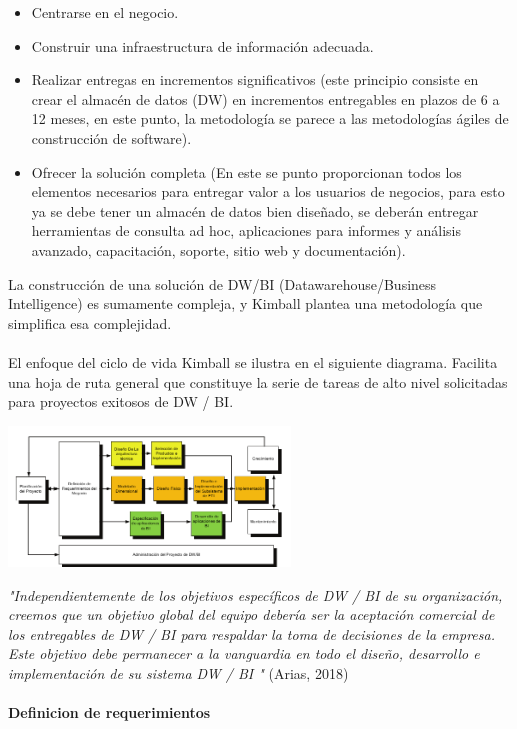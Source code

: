 \documentclass[twoside,twocolumn]{article}
\begin{document}
\begin{enumerate}
\begin{itemize}
\item Centrarse en el negocio.
\item Construir una infraestructura de información adecuada.
\item Realizar entregas en incrementos significativos (este principio consiste en crear el almacén de datos (DW) en incrementos entregables en plazos de 6 a 12 meses, en este punto, la metodología se parece a las metodologías ágiles de construcción de software).
\item Ofrecer la solución completa (En este se punto proporcionan todos los elementos necesarios para entregar valor a los usuarios de negocios, para esto ya se debe tener un almacén de datos bien diseñado, se deberán entregar herramientas de consulta ad hoc, aplicaciones para informes y análisis avanzado, capacitación, soporte, sitio web y documentación).

\end{itemize}
La construcción de una solución de DW/BI (Datawarehouse/Business Intelligence) es sumamente compleja, y Kimball plantea una metodología que simplifica esa complejidad. \\ \\
El enfoque del ciclo de vida Kimball se ilustra en el siguiente diagrama. Facilita una hoja de ruta general que constituye la serie de tareas de alto nivel solicitadas para proyectos exitosos de DW / BI.


\includegraphics[width=7.5cm]{Imagenes/Kimboll2}

\textit{"Independientemente de los objetivos específicos de DW / BI de su organización, creemos que un objetivo global del equipo debería ser la aceptación comercial de los entregables de DW / BI para respaldar la toma de decisiones de la empresa. Este objetivo debe permanecer a la vanguardia en todo el diseño, desarrollo e implementación de su sistema DW / BI "} (Arias, 2018)
\\ \\


\textbf{Definicion de requerimientos}


\end{enumerate}
\end{document}
